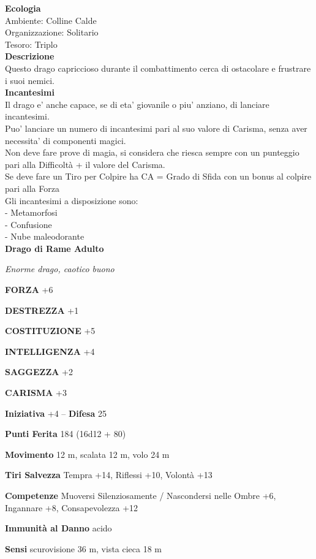 \begin{multicols}{2}
\textbf{Ecologia}\\
Ambiente: Colline Calde\\
Organizzazione: Solitario\\
Tesoro: Triplo\\
\textbf{Descrizione}\\
Questo drago capriccioso durante il combattimento cerca di ostacolare e frustrare i suoi nemici.\\
\textbf{Incantesimi}\\
Il drago e' anche capace, se di eta' giovanile o piu' anziano, di lanciare incantesimi.\\
Puo' lanciare un numero di incantesimi pari al suo valore di Carisma, senza aver necessita' di componenti magici.\\
Non deve fare prove di magia, si considera che riesca sempre con un punteggio pari alla Difficoltà + il valore del Carisma.\\
Se deve fare un Tiro per Colpire ha CA = Grado di Sfida con un bonus al colpire pari alla Forza\\
Gli incantesimi a disposizione sono:\\
- Metamorfosi\\
- Confusione\\
- Nube maleodorante\\


\medskip{}\textbf{Drago di Rame Adulto}

\emph{Enorme drago, caotico buono}

\textbf{FORZA} +6

\textbf{DESTREZZA} +1

\textbf{COSTITUZIONE} +5

\textbf{INTELLIGENZA} +4

\textbf{SAGGEZZA} +2

\textbf{CARISMA} +3

\textbf{Iniziativa} +4 -- \textbf{Difesa} 25

\textbf{Punti Ferita} 184 (16d12 + 80)

\textbf{Movimento} 12 m, scalata 12 m, volo 24 m

\textbf{Tiri Salvezza} Tempra +14, Riflessi +10, Volontà +13

\textbf{Competenze} Muoversi Silenziosamente / Nascondersi nelle Ombre +6, Ingannare +8, Consapevolezza +12

\textbf{Immunità al Danno} acido

\textbf{Sensi} scurovisione 36 m, vista cieca 18 m


\end{multicols}
